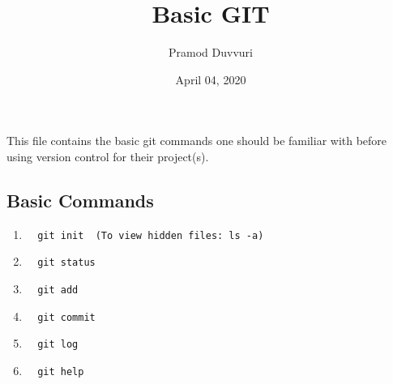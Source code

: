 \documentclass[11pt]{article}
\title{Basic GIT}
\author{Pramod Duvvuri}
\date{April 04, 2020}
\begin{document}
	\maketitle
	This file contains the basic git commands one should be familiar with before using version control for their project(s).
   \subsection*{Basic Commands}
   \begin{enumerate}
   	\item \begin{verbatim}  git init  (To view hidden files: ls -a)\end{verbatim}
    \item \begin{verbatim}  git status \end{verbatim}  	
    \item \begin{verbatim}  git add \end{verbatim}  	
    \item \begin{verbatim}  git commit \end{verbatim}  	
    \item \begin{verbatim}  git log \end{verbatim}  	
    \item \begin{verbatim}  git help \end{verbatim}  	   
   \end{enumerate}
\end{document}

